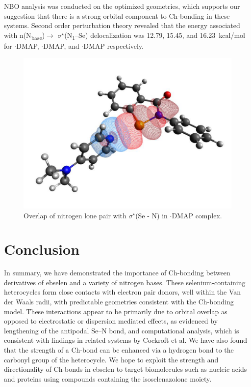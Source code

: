 \begin{refsection}
NBO analysis was conducted on the optimized geometries, which supports our suggestion that there is a strong orbital component to Ch-bonding in these systems.
Second order perturbation theory revealed that the energy associated with n(N\textsubscript{base})$\rightarrow$ $\sigma^{\star}$(N\textsubscript{1}--Se) delocalization was 12.79, 15.45, and 16.23~kcal/mol for $\cdot$DMAP, $\cdot$DMAP, and $\cdot$DMAP respectively.

\begin{figure}
  \centering
  \includegraphics[width=0.6\linewidth]{Figures/phenyl-dmap-overlap.pdf}
  \caption[Orbital overlap for $\cdot$DMAP.]{Overlap of nitrogen lone pair with $\sigma^{\star}$(Se - N) in $\cdot$DMAP complex.}
  \label{fig:phenyl-dmap-overlap}
\end{figure}

\section{Conclusion}
In summary, we have demonstrated the importance of Ch-bonding between derivatives of ebselen  and a variety of nitrogen bases.
These selenium-containing heterocycles form close contacts with electron pair donors, well within the Van der Waals radii, with predictable geometries consistent with the Ch-bonding model.
These interactions appear to be primarily due to orbital overlap as opposed to electrostatic or dispersion mediated effects, as evidenced by lengthening of the antipodal Se--N bond, and computational analysis, which is consistent with findings in related systems by Cockroft et al.\autocite{Pascoe2017}
We have also found that the strength of a Ch-bond can be enhanced via a hydrogen bond to the carbonyl group of the heterocycle.
We hope to exploit the strength and directionality of Ch-bonds in ebselen to target biomolecules such as nucleic acids and proteins using compounds containing the isoselenazolone moiety.


\end{refsection}
